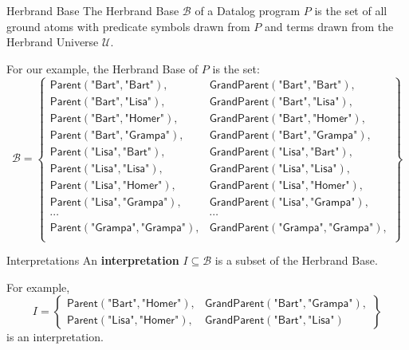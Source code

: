 \begin{frame}{Herbrand Base}
The Herbrand Base $\mathcal{B}$ of a Datalog program $P$ is the set of all
ground atoms with predicate symbols drawn from $P$ and terms drawn from the
Herbrand Universe $\mathcal{U}$.

For our example, the Herbrand Base of $P$ is the set:
\small
$$
\mathcal{B} = \left\{
\begin{array}{ll}
\textsf{Parent}(\textsf{"Bart"}, \textsf{"Bart"}),      & \textsf{GrandParent}(\textsf{"Bart"}, \textsf{"Bart"}), \\
\textsf{Parent}(\textsf{"Bart"}, \textsf{"Lisa"}),      & \textsf{GrandParent}(\textsf{"Bart"}, \textsf{"Lisa"}), \\
\textsf{Parent}(\textsf{"Bart"}, \textsf{"Homer"}),     & \textsf{GrandParent}(\textsf{"Bart"}, \textsf{"Homer"}), \\
\textsf{Parent}(\textsf{"Bart"}, \textsf{"Grampa"}),    & \textsf{GrandParent}(\textsf{"Bart"}, \textsf{"Grampa"}), \\
\textsf{Parent}(\textsf{"Lisa"}, \textsf{"Bart"}),      & \textsf{GrandParent}(\textsf{"Lisa"}, \textsf{"Bart"}), \\
\textsf{Parent}(\textsf{"Lisa"}, \textsf{"Lisa"}),      & \textsf{GrandParent}(\textsf{"Lisa"}, \textsf{"Lisa"}), \\
\textsf{Parent}(\textsf{"Lisa"}, \textsf{"Homer"}),     & \textsf{GrandParent}(\textsf{"Lisa"}, \textsf{"Homer"}), \\
\textsf{Parent}(\textsf{"Lisa"}, \textsf{"Grampa"}),    & \textsf{GrandParent}(\textsf{"Lisa"}, \textsf{"Grampa"}), \\
\cdots & \cdots \\ 
\textsf{Parent}(\textsf{"Grampa"}, \textsf{"Grampa"}),  & \textsf{GrandParent}(\textsf{"Grampa"}, \textsf{"Grampa"}), \\
\end{array}\right\}
$$
\end{frame}

\begin{frame}{Interpretations}
An \textbf{interpretation} $I \subseteq \mathcal{B}$ is a subset of the Herbrand
Base.

For example,
$$
I = \left\{
\begin{array}{ll}
\textsf{Parent}(\textsf{"Bart"}, \textsf{"Homer"}),      & \textsf{GrandParent}(\textsf{"Bart"}, \textsf{"Grampa"}), \\
\textsf{Parent}(\textsf{"Lisa"}, \textsf{"Homer"}),      & \textsf{GrandParent}(\textsf{"Bart"}, \textsf{"Lisa"})
\end{array}\right\}
$$
is an interpretation.
\end{frame}

